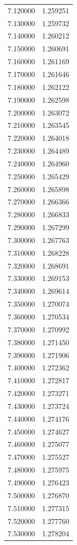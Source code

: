 \begin{tabular}{rr}
7.120000 & 1.259251 \\
7.130000 & 1.259732 \\
7.140000 & 1.260212 \\
7.150000 & 1.260691 \\
7.160000 & 1.261169 \\
7.170000 & 1.261646 \\
7.180000 & 1.262122 \\
7.190000 & 1.262598 \\
7.200000 & 1.263072 \\
7.210000 & 1.263545 \\
7.220000 & 1.264018 \\
7.230000 & 1.264489 \\
7.240000 & 1.264960 \\
7.250000 & 1.265429 \\
7.260000 & 1.265898 \\
7.270000 & 1.266366 \\
7.280000 & 1.266833 \\
7.290000 & 1.267299 \\
7.300000 & 1.267763 \\
7.310000 & 1.268228 \\
7.320000 & 1.268691 \\
7.330000 & 1.269153 \\
7.340000 & 1.269614 \\
7.350000 & 1.270074 \\
7.360000 & 1.270534 \\
7.370000 & 1.270992 \\
7.380000 & 1.271450 \\
7.390000 & 1.271906 \\
7.400000 & 1.272362 \\
7.410000 & 1.272817 \\
7.420000 & 1.273271 \\
7.430000 & 1.273724 \\
7.440000 & 1.274176 \\
7.450000 & 1.274627 \\
7.460000 & 1.275077 \\
7.470000 & 1.275527 \\
7.480000 & 1.275975 \\
7.490000 & 1.276423 \\
7.500000 & 1.276870 \\
7.510000 & 1.277315 \\
7.520000 & 1.277760 \\
7.530000 & 1.278204 \\

\end{tabular}
